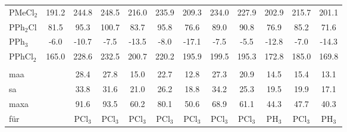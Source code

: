 \begin{table}[ht!]
{\begin{tabular}{lc|ccccc|ccccc}
    PMeCl$_{2}$ & 191.2 & 244.8 & 248.5 & 216.0 & 235.9 & 209.3 & 234.0 & 227.9 & 202.9 & 215.7 & 201.1 \\
    PPh$_{2}$Cl & 81.5  & 95.3  & 100.7 & 83.7  & 95.8  & 76.6  & 89.0  & 90.8  & 76.9  & 85.2  & 71.6 \\
    PPh$_{3}$  & -6.0  & -10.7 & -7.5  & -13.5 & -8.0  & -17.1 & -7.5  & -5.5  & -12.8 & -7.0  & -14.3 \\
    PPhCl$_{2}$ & 165.0 & 228.6 & 232.5 & 200.7 & 220.2 & 195.9 & 199.5 & 195.3 & 172.8 & 185.0 & 169.8 \\
          &       &       &       &       &       &       &       &       &       &       &  \\
    \ac{maa}   &       & 28.4  & 27.8  & 15.0  & 22.7  & 12.8  & 27.3  & 20.9  & 14.5  & 15.4  & 13.1 \\
    \ac{sa}   &       & 33.8  & 31.6  & 21.0  & 26.2  & 18.8  & 34.2  & 25.3  & 19.5  & 19.9  & 17.1 \\
    \ac{maxa}  &       & 91.6  & 93.5  & 60.2  & 80.1  & 50.6  & 68.9  & 61.1  & 44.3  & 47.7  & 40.3 \\
    für & & PCl$_{3}$ & PCl$_{3}$ & PCl$_{3}$ & PCl$_{3}$ & PCl$_{3}$ & PCl$_{3}$ & PCl$_{3}$ & PH$_{3}$ & PCl$_{3}$ & PH$_{3}$
    \end{tabular}%
  \label{tab:pshifts}}%
\end{table}%

